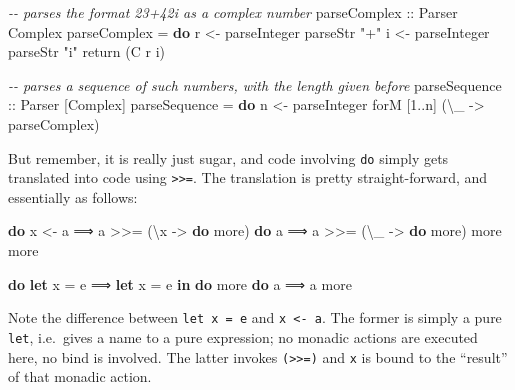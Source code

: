 \documentclass[11pt,
  american,
  DIV13]{article}
\newenvironment{Shaded}{}{}
\newcommand{\CommentTok}[1]{\textcolor[rgb]{0.38,0.63,0.69}{\textit{#1}}}
\newcommand{\DataTypeTok}[1]{\textcolor[rgb]{0.56,0.13,0.00}{#1}}
\newcommand{\DecValTok}[1]{\textcolor[rgb]{0.25,0.63,0.44}{#1}}
\newcommand{\FunctionTok}[1]{\textcolor[rgb]{0.02,0.16,0.49}{#1}}
\newcommand{\KeywordTok}[1]{\textcolor[rgb]{0.00,0.44,0.13}{\textbf{#1}}}
\newcommand{\NormalTok}[1]{#1}
\newcommand{\OperatorTok}[1]{\textcolor[rgb]{0.40,0.40,0.40}{#1}}
\newcommand{\OtherTok}[1]{\textcolor[rgb]{0.00,0.44,0.13}{#1}}
\newcommand{\StringTok}[1]{\textcolor[rgb]{0.25,0.44,0.63}{#1}}
\begin{document}
\begin{Shaded}
\begin{Highlighting}[]
\CommentTok{{-}{-} parses the format \textasciigrave{}23+42i\textasciigrave{} as a complex number}
\OtherTok{parseComplex ::} \DataTypeTok{Parser} \DataTypeTok{Complex}
\NormalTok{parseComplex }\OtherTok{=} \KeywordTok{do}
\NormalTok{  r }\OtherTok{\textless{}{-}}\NormalTok{ parseInteger}
\NormalTok{  parseStr }\StringTok{"+"}
\NormalTok{  i }\OtherTok{\textless{}{-}}\NormalTok{ parseInteger}
\NormalTok{  parseStr }\StringTok{"i"}
  \FunctionTok{return}\NormalTok{ (}\DataTypeTok{C}\NormalTok{ r i)}

\CommentTok{{-}{-} parses a sequence of such numbers, with the length given before}
\OtherTok{parseSequence ::} \DataTypeTok{Parser}\NormalTok{ [}\DataTypeTok{Complex}\NormalTok{]}
\NormalTok{parseSequence }\OtherTok{=} \KeywordTok{do}
\NormalTok{  n }\OtherTok{\textless{}{-}}\NormalTok{ parseInteger}
\NormalTok{  forM [}\DecValTok{1}\OperatorTok{..}\NormalTok{n] (\textbackslash{}\_ }\OtherTok{{-}\textgreater{}}\NormalTok{ parseComplex)}
\end{Highlighting}
\end{Shaded}

But remember, it is really just sugar, and code involving \texttt{do}
simply gets translated into code using
\texttt{\textgreater{}\textgreater{}=}. The translation is pretty
straight-forward, and essentially as follows:

\begin{Shaded}
\begin{Highlighting}[]
\KeywordTok{do}\NormalTok{ x }\OtherTok{\textless{}{-}}\NormalTok{ a     ⟹  a }\OperatorTok{\textgreater{}\textgreater{}=}\NormalTok{ (\textbackslash{}x }\OtherTok{{-}\textgreater{}} \KeywordTok{do}\NormalTok{ more)          }\KeywordTok{do}\NormalTok{ a          ⟹  a }\OperatorTok{\textgreater{}\textgreater{}=}\NormalTok{ (\textbackslash{}\_ }\OtherTok{{-}\textgreater{}} \KeywordTok{do}\NormalTok{ more)}
\NormalTok{   more                                             more}

\KeywordTok{do} \KeywordTok{let}\NormalTok{ x }\OtherTok{=}\NormalTok{ e  ⟹  }\KeywordTok{let}\NormalTok{ x }\OtherTok{=}\NormalTok{ e }\KeywordTok{in} \KeywordTok{do}\NormalTok{ more           }\KeywordTok{do}\NormalTok{ a          ⟹  a}
\NormalTok{   more}
\end{Highlighting}
\end{Shaded}

Note the difference between \texttt{let\ x\ =\ e} and
\texttt{x\ \textless{}-\ a}. The former is simply a pure \texttt{let},
i.e.~gives a name to a pure expression; no monadic actions are executed
here, no bind is involved. The latter invokes
\texttt{(\textgreater{}\textgreater{}=)} and \texttt{x} is bound to the
``result'' of that monadic action.
\end{document}
